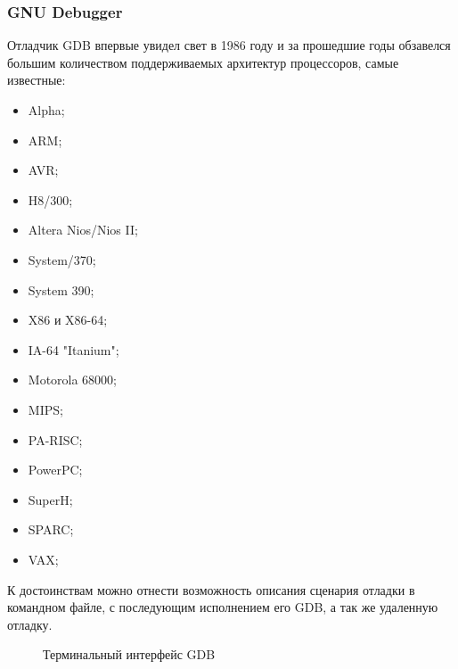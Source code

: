 \subsubsection{GNU Debugger}\label{sec:ch1/sec3/sub2/sub1}
Отладчик GDB впервые увидел свет в 1986 году и за прошедшие годы обзавелся
большим количеством поддерживаемых архитектур процессоров, самые известные:
\begin{itemize}
    \item Alpha;
    \item ARM;
    \item AVR;
    \item H8/300;
    \item Altera Nios/Nios II;
    \item System/370;
    \item System 390;
    \item X86 и X86-64;
    \item IA-64 "Itanium";
    \item Motorola 68000;
    \item MIPS;
    \item PA-RISC;
    \item PowerPC;
    \item SuperH;
    \item SPARC;
    \item VAX;
\end{itemize}
К достоинствам можно отнести возможность описания сценария отладки в командном файле,
с последующим исполнением его GDB, а так же удаленную отладку.
\begin{figure}[!htbp]
    \caption{Терминальный интерфейс GDB \label{fig:gdb-tui}}
\end{figure}

